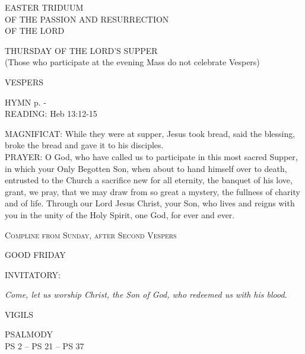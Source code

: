 \begin{center}\normalsize EASTER TRIDUUM\\
OF THE PASSION AND RESURRECTION\\
OF THE LORD\end{center}

\begin{center}
\normalsize THURSDAY OF THE LORD'S SUPPER\\
\tiny{(Those who participate at the evening Mass do not celebrate Vespers)}
\end{center}

\begin{flushleft}\normalsize{\uppercase{VESPERS\\}}\end{flushleft}
\small{\uppercase{HYMN} p. \pageref{lent:firstHymn}-\pageref{lent:lastHymn}\\}
\noindent\small{\uppercase{READING:}}    Heb 13:12-15 \textbf{   \\}

\noindent\small{\uppercase{MAGNIFICAT:}}	While they were at supper, Jesus took bread, said the blessing, broke the bread and gave it to his disciples.\\

\noindent\small{\uppercase{PRAYER:}}	O God, who have called us to participate in this most sacred Supper, in which your Only Begotten Son, when about to hand himself over to death, entrusted to the Church a sacrifice new for all eternity, the banquet of his love, grant, we pray, that we may draw from so great a mystery, the fullness of charity and of life. Through our Lord Jesus Christ, your Son, who lives and reigns with you in the unity of the Holy Spirit, one God, for ever and ever.

\begin{center}\small\textsc{Compline from Sunday, after Second Vespers}\end{center}

\begin{center}
\normalsize GOOD FRIDAY
\end{center}

\noindent\small{\uppercase{INVITATORY:}}\normalsize
\begin{center}
\textit{Come, let us worship Christ, the Son of God, who redeemed us with his blood.\\}
\end{center}
\begin{flushleft}\normalsize{\uppercase{VIGILS\\}}\end{flushleft}
\noindent\small{\uppercase{PSALMODY}\\}
\uppercase{Ps 2 -- Ps 21 -- Ps 37}\vspace{0.5em}\\

